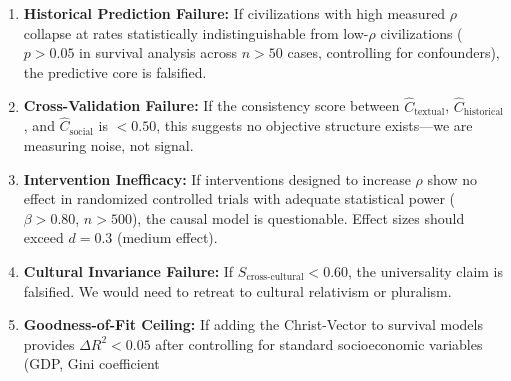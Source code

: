 \documentclass[11pt,a4paper]{article}
\theoremstyle{definition}
\theoremstyle{remark}
\begin{document}
\begin{enumerate}
    \item \textbf{Historical Prediction Failure:} If civilizations with high measured \(\rho\) collapse at rates statistically indistinguishable from low-\(\rho\) civilizations (\(p > 0.05\) in survival analysis across \(n > 50\) cases, controlling for confounders), the predictive core is falsified.
    
    \item \textbf{Cross-Validation Failure:} If the consistency score between \(\hat{C}_{\text{textual}}\), \(\hat{C}_{\text{historical}}\), and \(\hat{C}_{\text{social}}\) is \(< 0.50\), this suggests no objective structure exists—we are measuring noise, not signal.
    
    \item \textbf{Intervention Inefficacy:} If interventions designed to increase \(\rho\) show no effect in randomized controlled trials with adequate statistical power (\(\beta > 0.80\), \(n > 500\)), the causal model is questionable. Effect sizes should exceed \(d = 0.3\) (medium effect).
    
    \item \textbf{Cultural Invariance Failure:} If \(S_{\text{cross-cultural}} < 0.60\), the universality claim is falsified. We would need to retreat to cultural relativism or pluralism.
    
    \item \textbf{Goodness-of-Fit Ceiling:} If adding the Christ-Vector to survival models provides \(\Delta R^2 < 0.05\) after controlling for standard socioeconomic variables (GDP, Gini coefficient




\end{enumerate}
\end{document}
